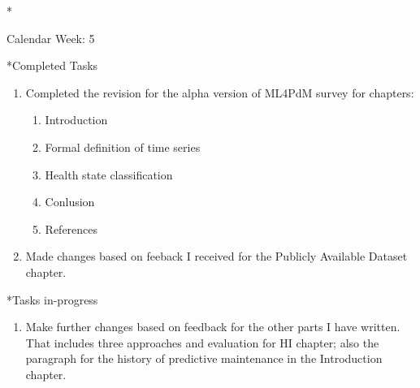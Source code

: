 \documentclass[11pt,a4paper]{article}
\begin{document}
\newpage
\begin{section}*{Calendar Week: 5  \hfill \date{5 February, 2021}}
 \begin{refsection}

       \begin{subsection}*{Completed Tasks}
             \begin{enumerate}
                   \item
                         Completed the revision for the alpha version of ML4PdM survey
                         for chapters:
                         \begin{enumerate}
                               \item Introduction
                               \item Formal definition of time series
                               \item Health state classification
                               \item Conlusion
                               \item References
                         \end{enumerate}
                   \item
                         Made changes based on feeback I received for the Publicly Available Dataset chapter.
             \end{enumerate}
       \end{subsection}

       \begin{subsection}*{Tasks in-progress}
             \begin{enumerate}
                   \item
                         Make further changes based on feedback for the other parts I have written. That
                         includes three approaches and evaluation for HI chapter; also the paragraph for
                         the history of predictive maintenance in the Introduction chapter.
             \end{enumerate}
       \end{subsection}

 \end{refsection}
\end{section}
\end{document}
